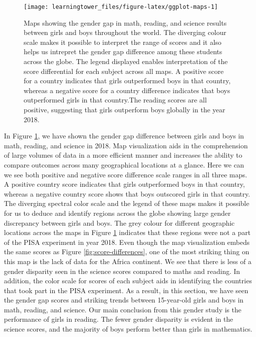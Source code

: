 \begin{figure}[H]
\texttt{[image: learningtower\_files/figure-latex/ggplot-maps-1]} \caption{Maps showing the gender gap in math, reading, and science results between girls and boys throughout the world. The diverging colour scale makes it possible to interpret the range of scores and it also helps us intrepret the gender gap difference among these students across the globe. The legend displayed enables interpretation of the score differential for each subject across all maps. A positive score for a country indicates that girls outperformed boys in that country, whereas a negative score for a country difference indicates that boys outperformed girls in that country.The reading scores are all positive, suggesting that girls outperform boys globally in the year 2018.}\label{fig:ggplot-maps}
\end{figure}

In Figure \ref{fig:ggplot-maps}, we have shown the gender gap difference between girls and boys in math, reading, and science in 2018. Map visualization aids in the comprehension of large volumes of data in a more efficient manner and increases the ability to compare outcomes across many geographical locations at a glance. Here we can we see both positive and negative score difference scale ranges in all three maps. A positive country score indicates that girls outperformed boys in that country, whereas a negative country score shows that boys outscored girls in that country. The diverging spectral color scale and the legend of these maps makes it possible for us to deduce and identify regions across the globe showing large gender discrepancy between girls and boys. The grey colour for different geographic locations across the maps in Figure \ref{fig:ggplot-maps} indicates that these regions were not a part of the PISA experiment in year 2018. Even though the map visualization embeds the same scores as Figure \ref{fig:score-differences}, one of the most striking thing on this map is the lack of data for the Africa continent. We see that there is less of a gender disparity seen in the science scores compared to maths and reading. In addition, the color scale for scores of each subject aids in identifying the countries that took part in the PISA experiment. As a result, in this section, we have seen the gender gap scores and striking trends between 15-year-old girls and boys in math, reading, and science. Our main conclusion from this gender study is the performance of girls in reading. The fewer gender disparity is evident in the science scores, and the majority of boys perform better than girls in mathematics.

